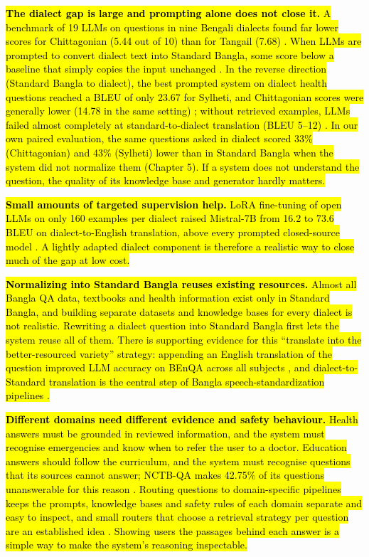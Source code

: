\hl{\textbf{The dialect gap is large and prompting alone does not close
it.} A benchmark of 19 LLMs on questions in nine Bengali dialects found
far lower scores for Chittagonian (5.44 out of 10) than for Tangail
(7.68) \cite{sami2026dialectbias}. When LLMs are prompted to convert dialect text into
Standard Bangla, some score below a baseline that simply copies the
input unchanged \cite{jawad2026fivedialects}. In the reverse direction (Standard Bangla to
dialect), the best prompted system on dialect health questions reached a
BLEU of only 23.67 for Sylheti, and Chittagonian scores were generally
lower (14.78 in the same setting) \cite{prantik2025}; without retrieved examples,
LLMs failed almost completely at standard-to-dialect translation (BLEU
5--12) \cite{sami2025comparative}. In our own paired evaluation, the same questions asked
in dialect scored 33\% (Chittagonian) and 43\% (Sylheti) lower than in
Standard Bangla when the system did not normalize them (Chapter 5). If a
system does not understand the question, the quality of its knowledge
base and generator hardly matters.}

\hl{\textbf{Small amounts of targeted supervision help.} LoRA
fine-tuning of open LLMs on only 160 examples per dialect raised
Mistral-7B from 16.2 to 73.6 BLEU on dialect-to-English translation,
above every prompted closed-source model \cite{jawad2026fivedialects}. A lightly adapted
dialect component is therefore a realistic way to close much of the gap
at low cost.}

\hl{\textbf{Normalizing into Standard Bangla reuses existing resources.}
Almost all Bangla QA data, textbooks and health information exist only
in Standard Bangla, and building separate datasets and knowledge bases
for every dialect is not realistic. Rewriting a dialect question into
Standard Bangla first lets the system reuse all of them. There is
supporting evidence for this ``translate into the better-resourced
variety'' strategy: appending an English translation of the question
improved LLM accuracy on BEnQA across all subjects \cite{shafayat2024benqa}, and
dialect-to-Standard translation is the central step of Bangla
speech-standardization pipelines \cite{samin2024bangladialecto}.}

\hl{\textbf{Different domains need different evidence and safety
behaviour.} Health answers must be grounded in reviewed information, and
the system must recognise emergencies and know when to refer the user to
a doctor. Education answers should follow the curriculum, and the system
must recognise questions that its sources cannot answer; NCTB-QA makes
42.75\% of its questions unanswerable for this reason \cite{nctbqa}. Routing
questions to domain-specific pipelines keeps the prompts, knowledge
bases and safety rules of each domain separate and easy to inspect, and
small routers that choose a retrieval strategy per question are an
established idea \cite{jeong2024adaptiverag}. Showing users the passages behind each answer
is a simple way to make the system's reasoning inspectable.}

